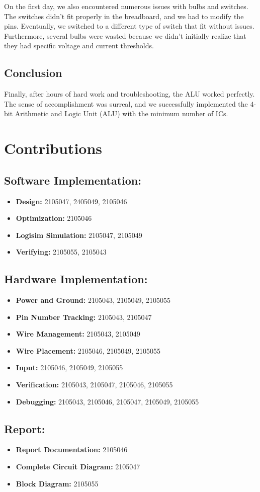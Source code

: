 \documentclass[12pt]{article}
\begin{document}
On the first day, we also encountered numerous issues with bulbs and switches. The switches didn’t fit properly in the breadboard, and we had to modify the pins. Eventually, we switched to a different type of switch that fit without issues. Furthermore, several bulbs were wasted because we didn’t initially realize that they had specific voltage and current thresholds.

\subsection{Conclusion}

Finally, after hours of hard work and troubleshooting, the ALU worked perfectly. The sense of accomplishment was surreal, and we successfully implemented the $4$-bit Arithmetic and Logic Unit (ALU) with the minimum number of ICs.


\section{Contributions}

\subsection{Software Implementation:}
\begin{itemize}
    \item \textbf{Design:} 2105047, 2405049, 2105046
    \item \textbf{Optimization:} 2105046
    \item \textbf{Logisim Simulation:} 2105047, 2105049
    \item \textbf{Verifying:} 2105055, 2105043
\end{itemize}
\subsection{Hardware Implementation:}
\begin{itemize}
    \item \textbf{Power and Ground:} 2105043, 2105049, 2105055
    \item \textbf{Pin Number Tracking:} 2105043, 2105047
    \item \textbf{Wire Management:} 2105043, 2105049
    \item \textbf{Wire Placement:} 2105046, 2105049, 2105055
    \item \textbf{Input:} 2105046, 2105049, 2105055
    \item \textbf{Verification:} 2105043, 2105047, 2105046, 2105055
    \item \textbf{Debugging:} 2105043, 2105046, 2105047, 2105049, 2105055
\end{itemize}
\subsection{Report:}
\begin{itemize}
    \item \textbf{Report Documentation:} 2105046
    \item \textbf{Complete Circuit Diagram:} 2105047
    \item \textbf{Block Diagram: } 2105055
\end{itemize}
\end{document}
